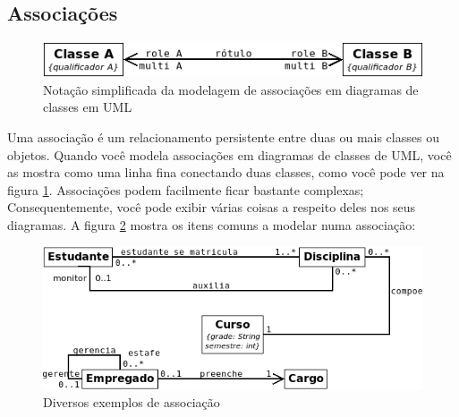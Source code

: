 \subsection{Associações}

\begin{figure}
\begin{center}
\includegraphics[scale=0.6]{assocCls.png} 
\caption{Notação simplificada da modelagem de associações em diagramas de classes em UML} \label{fig:uml5}
\end{center}
\end{figure}

Uma associação é um relacionamento persistente entre duas ou mais classes ou objetos. Quando você modela associações em diagramas de classes de UML, você as mostra como uma linha fina conectando duas classes, como você pode ver na figura \ref{fig:uml5}. Associações podem facilmente ficar bastante complexas; Consequentemente, você pode exibir várias coisas a respeito deles nos seus diagramas. A figura \ref{fig:uml6} mostra os itens comuns a modelar numa associação:

\begin{figure}
\begin{center}
\includegraphics[scale=0.6]{assocCls2.png} 
\caption{Diversos exemplos de associação} \label{fig:uml6}
\end{center}
\end{figure}

